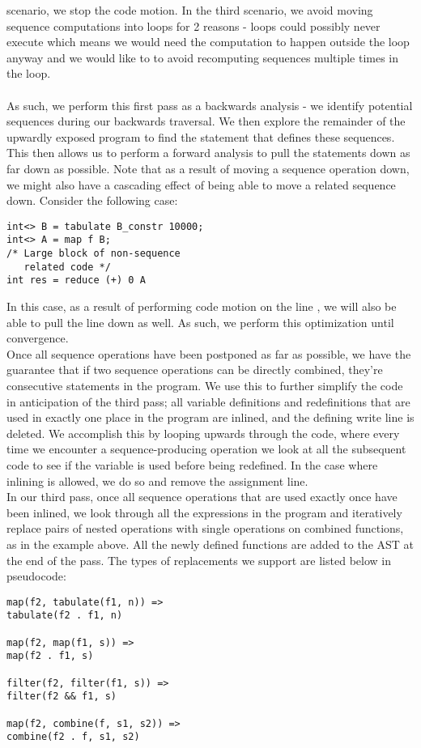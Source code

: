 \documentclass[a4paper,twocolumn]{article}
\begin{document}
scenario, we stop the code motion. In the third scenario, we avoid moving
sequence computations into loops for 2 reasons - loops could possibly never
execute which means we would need the computation to happen outside the loop
anyway and we would like to to avoid recomputing sequences
multiple times in the loop.
\\
\\As such, we perform this first pass as a backwards analysis - we identify
potential sequences during our backwards traversal. We then explore the
remainder of the upwardly exposed program to find the statement that defines
these sequences. This then allows us to perform a forward analysis to pull the
statements down as far down as possible. Note that as a result of moving a
sequence operation down, we might also have a cascading effect of being able to
move a related sequence down. Consider the following case:
\begin{verbatim}
int<> B = tabulate B_constr 10000;
int<> A = map f B;
/* Large block of non-sequence
   related code */
int res = reduce (+) 0 A
\end{verbatim}
In this case, as a result of performing code motion on the line , we will also be able to pull the line 
down as well. As such, we perform this optimization until convergence.\\

\noindent
Once all sequence operations have been postponed as far as possible, we have
the guarantee that if two sequence operations can be directly combined, they're
consecutive statements in the program. We use this to further simplify the code
in anticipation of the third pass; all variable definitions and redefinitions
that are used in exactly one place in the program are inlined, and the defining
write line is deleted. We accomplish this by looping upwards through the code,
where every time we encounter a sequence-producing operation we look at all the
subsequent code to see if the variable is used before being redefined. In the
case where inlining is allowed, we do so and remove the assignment line.\\

In our third pass, once all sequence operations that are used exactly once have
been inlined, we look through all the expressions in the program and
iteratively replace pairs of nested operations with single operations on
combined functions, as in the example above. All the newly defined functions
are added to the AST at the end of the pass. The types of replacements we
support are listed below in pseudocode:
\begin{verbatim}
map(f2, tabulate(f1, n)) =>
tabulate(f2 . f1, n)

map(f2, map(f1, s)) =>
map(f2 . f1, s)

filter(f2, filter(f1, s)) =>
filter(f2 && f1, s)

map(f2, combine(f, s1, s2)) =>
combine(f2 . f, s1, s2)
\end{verbatim}
\end{document}

